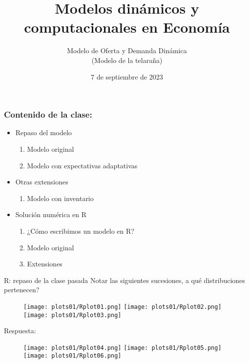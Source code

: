 \documentclass[11pt]{beamer}
\begin{document}
	\title{Modelos dinámicos y computacionales en Economía}
	\subtitle{Modelo de Oferta y Demanda Dinámica \\ (Modelo de la telaraña)}
	\date{7 de septiembre de 2023}
	\frame[plain]{\maketitle}

\begin{frame}
\frametitle{Contenido de la clase:}
\begin{itemize}
	\item Repaso del modelo
	\begin{enumerate}
	\item Modelo original 
	\item Modelo con expectativas adaptativas
\end{enumerate}		
	\item Otras extensiones
	\begin{enumerate}
		\item Modelo con inventario 
	\end{enumerate}	
\item Solución numérica en R
	\begin{enumerate}
	\item ¿Cómo escribimos un modelo en R?
	\item Modelo original
	\item Extensiones
\end{enumerate}	
\end{itemize}
\end{frame}


\begin{frame}{R: repaso de la clase pasada}
    Notar las siguientes sucesiones, a qué distribuciones pertenecen?
    \begin{figure}
        \centering
        \texttt{[image: plots01/Rplot01.png]}
\texttt{[image: plots01/Rplot02.png]}
        \texttt{[image: plots01/Rplot03.png]}
        \label{fig:my_label}
    \end{figure}
\pause
Respuesta:
        \begin{figure}
        \centering
        \texttt{[image: plots01/Rplot04.png]}
\texttt{[image: plots01/Rplot05.png]}
        \texttt{[image: plots01/Rplot06.png]}
        \label{fig:my_label}
    \end{figure}
\end{frame}
\end{document}
